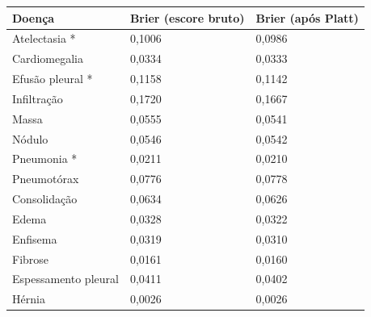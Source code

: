 \begin{tabular}{lll}
\toprule
Doença & Brier (escore bruto) & Brier (após Platt) \\
\midrule
Atelectasia * & 0,1006 & 0,0986 \\
Cardiomegalia & 0,0334 & 0,0333 \\
Efusão pleural * & 0,1158 & 0,1142 \\
Infiltração & 0,1720 & 0,1667 \\
Massa & 0,0555 & 0,0541 \\
Nódulo & 0,0546 & 0,0542 \\
Pneumonia * & 0,0211 & 0,0210 \\
Pneumotórax & 0,0776 & 0,0778 \\
Consolidação & 0,0634 & 0,0626 \\
Edema & 0,0328 & 0,0322 \\
Enfisema & 0,0319 & 0,0310 \\
Fibrose & 0,0161 & 0,0160 \\
Espessamento pleural & 0,0411 & 0,0402 \\
Hérnia & 0,0026 & 0,0026 \\
\bottomrule
\end{tabular}

